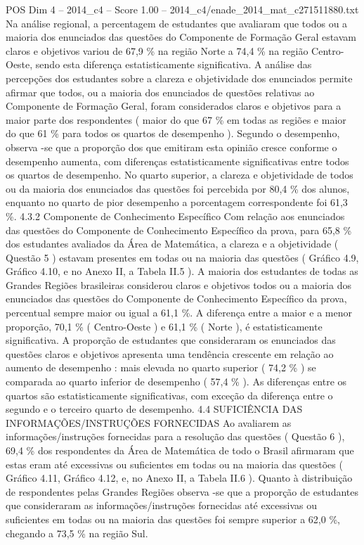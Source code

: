 \begin{textsample}{POS Dim 4 – 2014\_c4 – Score 1.00 – 2014\_c4/enade\_2014\_mat\_c271511880.txt}
Na análise regional, a percentagem de estudantes que avaliaram que todos ou a maioria dos enunciados das questões do Componente de Formação Geral estavam claros e objetivos variou de 67,9 \% na região Norte a 74,4 \% na região Centro-Oeste, sendo esta diferença estatisticamente significativa.
A análise das percepções dos estudantes sobre a clareza e objetividade dos enunciados permite afirmar que todos, ou a maioria dos enunciados de questões relativas ao Componente de Formação Geral, foram considerados claros e objetivos para a maior parte dos respondentes ( maior do que 67 \% em todas as regiões e maior do que 61 \% para todos os quartos de desempenho ).
Segundo o desempenho, observa -se que a proporção dos que emitiram esta opinião cresce conforme o desempenho aumenta, com diferenças estatisticamente significativas entre todos os quartos de desempenho.
No quarto superior, a clareza e objetividade de todos ou da maioria dos enunciados das questões foi percebida por 80,4 \% dos alunos, enquanto no quarto de pior desempenho a porcentagem correspondente foi 61,3 \%. 4.3.2 Componente de Conhecimento Específico Com relação aos enunciados das questões do Componente de Conhecimento Específico da prova, para 65,8 \% dos estudantes avaliados da Área de Matemática, a clareza e a objetividade ( Questão 5 ) estavam presentes em todas ou na maioria das questões ( Gráfico 4.9, Gráfico 4.10, e no Anexo II, a Tabela II.5 ).
A maioria dos estudantes de todas as Grandes Regiões brasileiras considerou claros e objetivos todos ou a maioria dos enunciados das questões do Componente de Conhecimento Específico da prova, percentual sempre maior ou igual a 61,1 \%.
A diferença entre a maior e a menor proporção, 70,1 \% ( Centro-Oeste ) e 61,1 \% ( Norte ), é estatisticamente significativa.
A proporção de estudantes que consideraram os enunciados das questões claros e objetivos apresenta uma tendência crescente em relação ao aumento de desempenho : mais elevada no quarto superior ( 74,2 \% ) se comparada ao quarto inferior de desempenho ( 57,4 \% ).
As diferenças entre os quartos são estatisticamente significativas, com exceção da diferença entre o segundo e o terceiro quarto de desempenho. 4.4 SUFICIÊNCIA DAS INFORMAÇÕES/INSTRUÇÕES FORNECIDAS Ao avaliarem as informações/instruções fornecidas para a resolução das questões ( Questão 6 ), 69,4 \% dos respondentes da Área de Matemática de todo o Brasil afirmaram que estas eram até excessivas ou suficientes em todas ou na maioria das questões ( Gráfico 4.11, Gráfico 4.12, e, no Anexo II, a Tabela II.6 ).
Quanto à distribuição de respondentes pelas Grandes Regiões observa -se que a proporção de estudantes que consideraram as informações/instruções fornecidas até excessivas ou suficientes em todas ou na maioria das questões foi sempre superior a 62,0 \%, chegando a 73,5 \% na região Sul.

\end{textsample}
